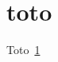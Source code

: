 \documentclass{article}
\begin{document}
\section{toto}\label{titi}
Toto~\ref{titi}
\printindex
\end{document}
